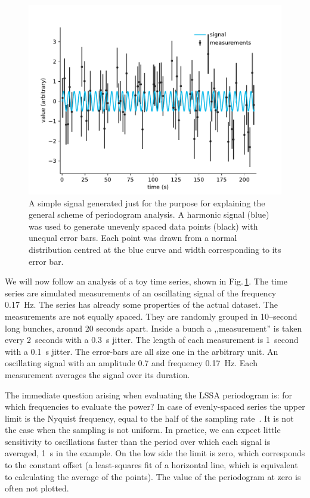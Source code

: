 \begin{figure}
  \centering \includegraphics[width=0.8\linewidth]{gfx/axions/basic_signal.pdf}
  \caption{A simple signal generated just for the purpose for explaining the general scheme of periodogram analysis. A harmonic signal (blue) was used to generate unevenly spaced data points (black) with unequal error bars. Each point was drawn from a normal distribution centred at the blue curve and width corresponding to its error bar.}
  \label{fig:basic_signal}
\end{figure}

We will now follow an analysis of a toy time series, shown in Fig.\,\ref{fig:basic_signal}. The time series are simulated measurements of an oscillating signal of the frequency \SI{0.17}{\hertz}. The series has already some properties of the actual dataset. The measurements are not equally spaced. They are randomly grouped in 10--second long bunches, aronud 20 seconds apart. Inside a bunch a ,,measurement'' is taken every 2~seconds with a \SI{0.3}{\second} jitter. The length of each measurement is 1~second with a \SI{0.1}{\second} jitter. The error-bars are all size one in the arbitrary unit. An oscillating signal with an amplitude 0.7 and frequency \SI{0.17}{\hertz}. Each measurement averages the signal over its duration.

The immediate question arising when evaluating the LSSA periodogram is: for which frequencies to evaluate the power? In case of evenly-spaced series the upper limit is the Nyquist frequency, equal to the half of the sampling rate~\cite{Shannon1949}. It is not the case when the sampling is not uniform. In practice, we can expect little sensitivity to oscillations faster than the period over which each signal is averaged, \SI{1}{\second} in the example. On the low side the limit is zero, which corresponds to the constant offset (a least-squares fit of a horizontal line, which is equivalent to calculating the average of the points). The value of the periodogram at zero is often not plotted.


